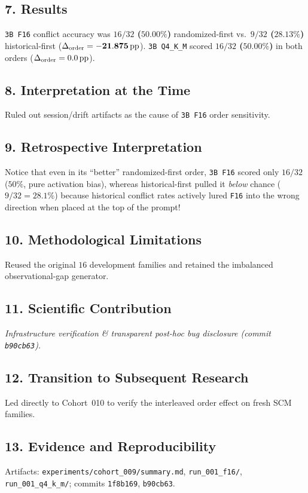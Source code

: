 \subsection*{7. Results}
\texttt{3B F16} conflict accuracy was \textbf{$16/32$ ($50.00\%$)} randomized-first vs.\ \textbf{$9/32$ ($28.13\%$)} historical-first ($\Delta_{\mathrm{order}} = \mathbf{-21.875\,\mathrm{pp}}$). \texttt{3B Q4\_K\_M} scored \textbf{$16/32$ ($50.00\%$)} in both orders ($\Delta_{\mathrm{order}} = 0.0\,\mathrm{pp}$).

\subsection*{8. Interpretation at the Time}
Ruled out session/drift artifacts as the cause of \texttt{3B F16} order sensitivity.

\subsection*{9. Retrospective Interpretation}
Notice that even in its ``better'' randomized-first order, \texttt{3B F16} scored only $16/32$ ($50\%$, pure activation bias), whereas historical-first pulled it \emph{below} chance ($9/32 = 28.1\%$) because historical conflict rates actively lured \texttt{F16} into the wrong direction when placed at the top of the prompt!

\subsection*{10. Methodological Limitations}
Reused the original $16$ development families and retained the imbalanced observational-gap generator.

\subsection*{11. Scientific Contribution}
\emph{Infrastructure verification \& transparent post-hoc bug disclosure (commit \texttt{b90cb63}).}

\subsection*{12. Transition to Subsequent Research}
Led directly to Cohort~010 to verify the interleaved order effect on fresh SCM families.

\subsection*{13. Evidence and Reproducibility}
Artifacts: \texttt{experiments/cohort\_009/summary.md}, \texttt{run\_001\_f16/}, \texttt{run\_001\_q4\_k\_m/}; commits \texttt{1f8b169}, \texttt{b90cb63}.

